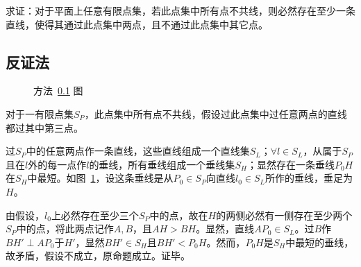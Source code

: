 

求证：对于平面上任意有限点集，若此点集中所有点不共线，则必然存在至少一条直线，使得其通过此点集中两点，且不通过此点集中其它点。

\subsection{反证法} \label{subsec:00BF-cont}

\begin{figure}[htbp]
  \centering {}
  \caption{方法~\ref{subsec:00BF-cont} 图}
  \label{fig:00BF-cont}
\end{figure}

对于一有限点集$S_P$，此点集中所有点不共线，假设过此点集中过任意两点的直线都过其中第三点。

过$S_P$中的任意两点作一条直线，这些直线组成一个直线集$S_L$；$\forall l \in S_L$，从属于$S_P$且在$l$外的每一点作$l$的垂线，所有垂线组成一个垂线集$S_H$；显然存在一条垂线$P_0H$在$S_H$中最短。如图~\ref{fig:00BF-cont}，设这条垂线是从$P_0 \in S_P$向直线$l_0 \in S_L$所作的垂线，垂足为$H$。

由假设，$l_0$上必然存在至少三个$S_P$中的点，故在$H$的两侧必然有一侧存在至少两个$S_P$中的点，将此两点记作$A, B$，且$AH > BH$。显然，直线$AP_0 \in S_L$。过$B$作$BH' \perp AP_0$于$H'$，显然$BH' \in S_H$且$BH' < P_0H$。然而，$P_0H$是$S_H$中最短的垂线，故矛盾，假设不成立，原命题成立。证毕。

